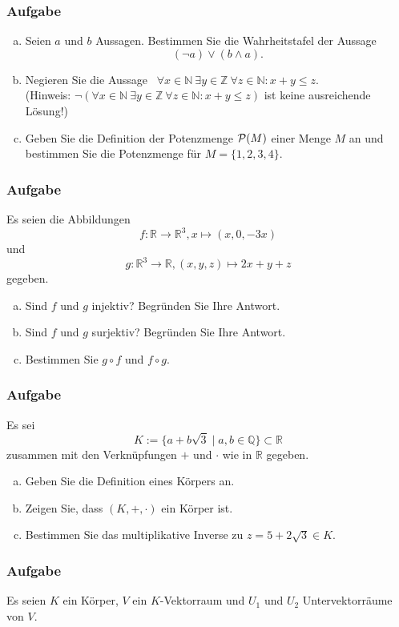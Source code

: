 \documentclass[a4paper,11pt]{scrartcl}
\newcounter{auf}
\newcommand{\Aufgabe}%
        {\addtocounter{auf}{1} \subsubsection*{\rmfamily  Aufgabe \theauf \hspace{1em}} }
\newcommand{\N}{\mathbb{N}}
\newcommand{\RR}{\mathbb{R}}
\newcommand{\Z}{\mathbb{Z}}
\newcommand{\Q}{\mathbb{Q}}
\begin{document}
\Aufgabe

\begin{enumerate}[a)]

\item Seien $a$ und $b$  Aussagen. 
Bestimmen Sie die Wahrheitstafel der Aussage
$$
	(\neg a) \lor (b \land a).
$$
\item Negieren Sie die Aussage \ $\forall x \in \N\ \exists y \in \Z\ \forall z \in \N: x+y \le z$.\vspace{2mm}\\
(Hinweis: $\neg(\forall x \in \N\ \exists y \in \Z\ \forall z \in \N: x+y \le z)$ ist keine ausreichende Lösung!)\\
\item Geben Sie die Definition der Potenzmenge ${\cal P}(M)$ einer Menge $M$ an und bestimmen Sie die Potenzmenge für $M = \{1,2,3,4\}.$
\end{enumerate}



\newpage
\Aufgabe
Es seien die Abbildungen $$f:\RR \to \RR^3, x \mapsto (x, 0, -3x)$$ und $$g: \RR^3 \to \RR, (x,y,z) \mapsto 2x+y+z$$ gegeben. 
\begin{enumerate}[a)]
\item Sind $f$ und $g$ injektiv? Begründen Sie Ihre Antwort.
\item Sind $f$ und $g$ surjektiv? Begründen Sie Ihre Antwort.
\item Bestimmen Sie $g \circ f$ und $f\circ g$.
\end{enumerate}



\newpage
\Aufgabe
Es sei 
$$K:=\{a+b\sqrt{3} \mid a,b \in  \Q \} \subset \RR$$
zusammen mit den Verknüpfungen $+$ und $\cdot$ wie in $\RR$ gegeben.
\begin{enumerate}[a)]
\item Geben Sie die Definition eines Körpers an.

\item Zeigen Sie, dass $(K,+,\cdot)$ ein Körper ist.

\item Bestimmen Sie das multiplikative Inverse zu $z=5+2\sqrt{3} \in K$. 

\end{enumerate}



\newpage
\Aufgabe

Es seien $K$ ein Körper, $V$ ein $K$-Vektorraum und $U_1$ und $U_2$
Untervektorräume von $V.$
\end{document}
